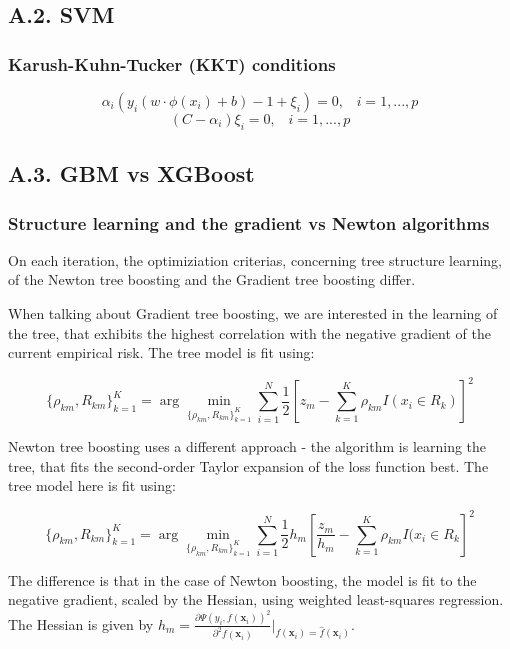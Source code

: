 \documentclass[12pt,]{article}
\begin{document}
\hypertarget{a.2.-svm}{%
\subsection{A.2. SVM}\label{a.2.-svm}}

\hypertarget{karush-kuhn-tucker-kkt-conditions}{%
\subsubsection{Karush-Kuhn-Tucker (KKT)
conditions}\label{karush-kuhn-tucker-kkt-conditions}}

\[\alpha_i(y_i(w\cdot\phi(x_i)+b)-1+\xi_i)=0,\;\;\;i=1,...,p\]
\[(C-\alpha_i)\xi_i=0,\;\;\;i=1,...,p\]

\hypertarget{a.3.-gbm-vs-xgboost}{%
\subsection{A.3. GBM vs XGBoost}\label{a.3.-gbm-vs-xgboost}}

\hypertarget{structure-learning-and-the-gradient-vs-newton-algorithms}{%
\subsubsection{Structure learning and the gradient vs Newton
algorithms}\label{structure-learning-and-the-gradient-vs-newton-algorithms}}

On each iteration, the optimiziation criterias, concerning tree
structure learning, of the Newton tree boosting and the Gradient tree
boosting differ.

When talking about Gradient tree boosting, we are interested in the
learning of the tree, that exhibits the highest correlation with the
negative gradient of the current empirical risk. The tree model is fit
using:

\[\{\rho_{km}, R_{km}\}_{k=1}^{K}=\arg\min_{\{\rho_{km}, R_{km}\}_{k=1}^{K}}\sum_{i=1}^{N}\frac{1}{2}[z_{m}-\sum_{k=1}^{K}\rho_{km}I(x_{i}\in R_k)]^2\]

Newton tree boosting uses a different approach - the algorithm is
learning the tree, that fits the second-order Taylor expansion of the
loss function best. The tree model here is fit using:

\[\{\rho_{km}, R_{km}\}_{k=1}^{K}=\arg\min_{\{\rho_{km}, R_{km}\}_{k=1}^{K}}\sum_{i=1}^{N}\frac{1}{2}h_m[\frac{z_m}{h_m}-\sum_{k=1}^{K}\rho_{km}I(x_{i}\in R_k]^2\]

The difference is that in the case of Newton boosting, the model is fit
to the negative gradient, scaled by the Hessian, using weighted
least-squares regression. The Hessian is given by
\(h_m = \frac{\partial{\Psi(y_{i},f(\mathbf{x}_i))}^{2}}{\partial^{2}{f(\mathbf{x}_i)}}\rvert_{f(\mathbf{x}_i)=\widehat{f}(\mathbf{x}_i)}\).
\end{document}
